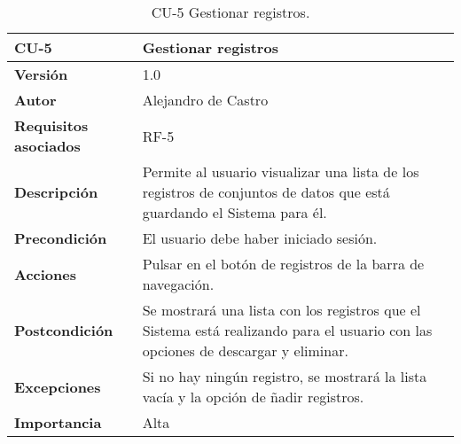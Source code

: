 \begin{table}[p]
	\centering
	\begin{tabularx}{\linewidth}{ p{} p{} }
		\toprule
		\textbf{CU-5}    & \textbf{Gestionar registros}\\
		\toprule
		\textbf{Versión}              & 1.0    \\
		\textbf{Autor}                & {Alejandro de Castro} \\
		\textbf{Requisitos asociados} & RF-5 \\
		\textbf{Descripción}          & Permite al usuario visualizar una lista de los registros de conjuntos de datos que está guardando el Sistema para él. \\
		\textbf{Precondición}         & El usuario debe haber iniciado sesión. \\
		\textbf{Acciones}             & Pulsar en el botón de registros de la barra de navegación.\\
		\textbf{Postcondición}        & Se mostrará una lista con los registros que el Sistema está realizando para el usuario con las opciones de descargar y eliminar. \\
		\textbf{Excepciones}          & Si no hay ningún registro, se mostrará la lista vacía y la opción de ñadir registros. \\
		\textbf{Importancia}          & Alta \\
		\bottomrule
	\end{tabularx}
	\caption{CU-5 Gestionar registros.}
\end{table}

